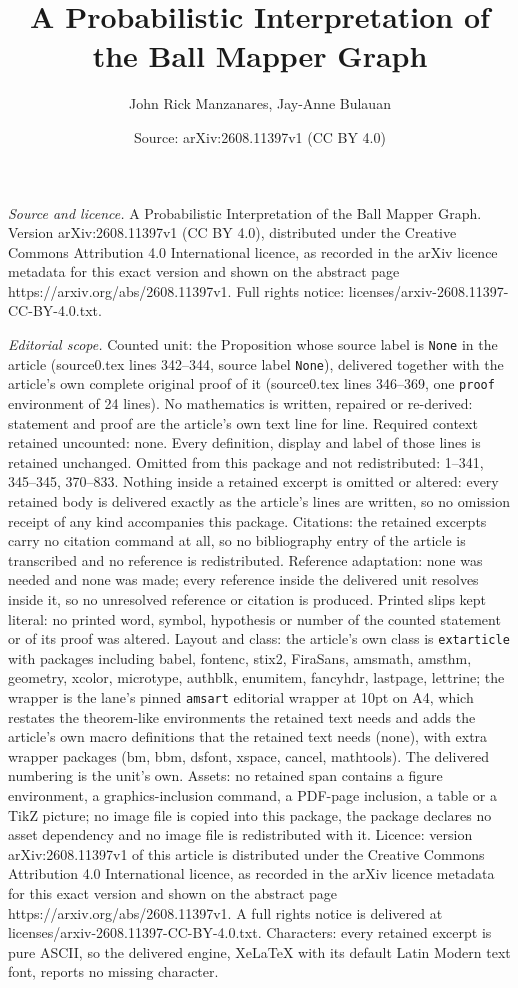 \documentclass[10pt,a4paper]{amsart}
\title[A Probabilistic Interpretation of the Ball Mapper Graph]{A Probabilistic Interpretation of the Ball Mapper Graph}
\author{John Rick Manzanares, Jay-Anne Bulauan}
\date{Source: arXiv:2608.11397v1 (CC BY 4.0)}
\begin{document}
\maketitle

\noindent\emph{Source and licence.} A Probabilistic Interpretation of the Ball Mapper Graph. Version arXiv:2608.11397v1 (CC BY 4.0), distributed under the Creative Commons Attribution 4.0 International licence, as recorded in the arXiv licence metadata for this exact version and shown on the abstract page https://arxiv.org/abs/2608.11397v1. Full rights notice: licenses/arxiv-2608.11397-CC-BY-4.0.txt.\par\smallskip

\noindent\textit{Editorial scope.} Counted unit: the Proposition whose source label is \texttt{None} in the article (source0.tex lines 342--344, source label \texttt{None}), delivered together with the article's own complete original proof of it (source0.tex lines 346--369, one \texttt{proof} environment of 24 lines). No mathematics is written, repaired or re-derived: statement and proof are the article's own text line for line. Required context retained uncounted: none. Every definition, display and label of those lines is retained unchanged. Omitted from this package and not redistributed: 1--341, 345--345, 370--833. Nothing inside a retained excerpt is omitted or altered: every retained body is delivered exactly as the article's lines are written, so no omission receipt of any kind accompanies this package. Citations: the retained excerpts carry no citation command at all, so no bibliography entry of the article is transcribed and no reference is redistributed. Reference adaptation: none was needed and none was made; every reference inside the delivered unit resolves inside it, so no unresolved reference or citation is produced. Printed slips kept literal: no printed word, symbol, hypothesis or number of the counted statement or of its proof was altered. Layout and class: the article's own class is \texttt{extarticle} with packages including babel, fontenc, stix2, FiraSans, amsmath, amsthm, geometry, xcolor, microtype, authblk, enumitem, fancyhdr, lastpage, lettrine; the wrapper is the lane's pinned \texttt{amsart} editorial wrapper at 10pt on A4, which restates the theorem-like environments the retained text needs and adds the article's own macro definitions that the retained text needs (none), with extra wrapper packages (bm, bbm, dsfont, xspace, cancel, mathtools). The delivered numbering is the unit's own. Assets: no retained span contains a figure environment, a graphics-inclusion command, a PDF-page inclusion, a table or a TikZ picture; no image file is copied into this package, the package declares no asset dependency and no image file is redistributed with it. Licence: version arXiv:2608.11397v1 of this article is distributed under the Creative Commons Attribution 4.0 International licence, as recorded in the arXiv licence metadata for this exact version and shown on the abstract page https://arxiv.org/abs/2608.11397v1. A full rights notice is delivered at licenses/arxiv-2608.11397-CC-BY-4.0.txt. Characters: every retained excerpt is pure ASCII, so the delivered engine, XeLaTeX with its default Latin Modern text font, reports no missing character.
\end{document}
